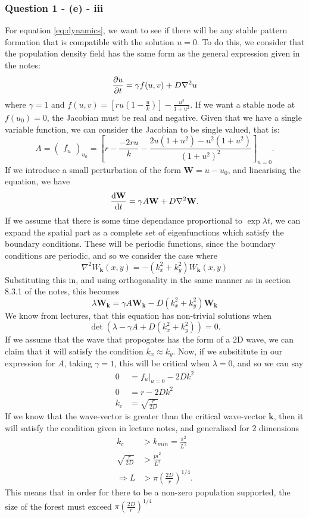 \documentclass[11pt,a4paper]{article}
\begin{document}
\subsubsection{Question 1 - (e) - iii}
\label{sec:question1:subsec:parte:subsub:iii}
For equation \eqref{eq:dynamics}, we want to see if there will be any stable pattern formation that is compatible with the solution $u=0$. To do this, we consider that the population density field has the same form as the general expression given in the notes:
$$ \pdv{u}{t} = \gamma f(u,v) + D \nabla^2 u $$
where $\gamma = 1$ and $f(u,v) = \left[ ru \left( 1 - \frac{u}{k} \right) \right] - \frac{u^2}{1+u^2}$. If we want a stable node at $f(u_0) = 0$, the Jacobian must be real and negative. Given that we have a single variable function, we can consider the Jacobian to be single valued, that is:
$$ A = \begin{pmatrix}
f_u
\end{pmatrix}_{u_0} = \left[r - \frac{-2r u}{k} - \frac{2u (1+u^2) - u^2 (1+u^2)}{(1+u^2)^2}\right]_{u=0}.$$
If we introduce a small perturbation of the form $ \textbf{W} = u - u_0 $, and linearising the equation, we have 
$$ \dv{\textbf{W}}{t} = \gamma A \textbf{W} + D \nabla^2 \textbf{W} .$$
If we assume that there is some time dependance proportional to $\exp{\lambda t}$, we can expand the spatial part as a complete set of eigenfunctions which satisfy the boundary conditions. These will be periodic functions, since the boundary conditions are periodic, and so we consider the case where 
$$ \nabla^2 W_\textbf{k}(x,y) = - (k_x^2+k_y^2) W_\textbf{k}(x,y) $$
Substituting this in, and using orthogonality in the same manner as in section 8.3.1 of the notes, this becomes 
$$ \lambda \textbf{W}_\textbf{k} = \gamma A \textbf{W}_\textbf{k} - D (k_x^2 + k_y^2) \textbf{W}_\textbf{k} $$
We know from lectures, that this equation has non-trivial solutions when 
$$ \det(\lambda - \gamma A + D (k_x^2 + k_y^2) )= 0 .$$
If we assume that the wave that propogates has the form of a 2D wave, we can claim that it will satisfy the condition $k_x \approx k_y$. Now, if we subsititute in our expression for $A$, taking $\gamma = 1$, this will be critical when $\lambda = 0$, and so we can say 
\begin{align*}
0 &= f_u\rvert_{u=0} - 2D k^2 \\ 
0 &= r - 2 D k^2 \\
k_c &= \sqrt{\frac{r}{2D}}
\end{align*}
If we know that the wave-vector is greater than the critical wave-vector $\textbf{k}$, then it will satisfy the condition given in lecture notes, and generalised for 2 dimensions
\begin{align*}
k_c &> k_{min} = \frac{\pi^2}{L^2} \\
\sqrt{\frac{r}{2D}} &> \frac{pi^2}{L^2} \\ 
\Rightarrow L &> \pi \left( \frac{2D}{r} \right)^{1/4}.
\end{align*}
This means that in order for there to be a non-zero population supported, the size of the forest must exceed $\pi \left( \frac{2D}{r} \right)^{1/4}$
\end{document}
